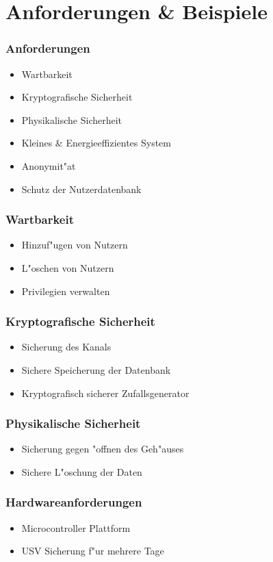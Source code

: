 \section{Anforderungen \& Beispiele}
\begin{frame}
	\frametitle{Anforderungen}
	\begin{itemize}
		\item<2-> Wartbarkeit
		\item<3-> Kryptografische Sicherheit
		\item<4-> Physikalische Sicherheit
		\item<5-> Kleines \& Energieeffizientes System
		\item<6-> Anonymit"at
		\item<7-> Schutz der Nutzerdatenbank
	\end{itemize}
\end{frame}
\begin{frame}
	\frametitle{Wartbarkeit}
	\begin{itemize}
		\item<2-> Hinzuf"ugen von Nutzern
		\item<3-> L"oschen von Nutzern
		\item<4-> Privilegien verwalten
	\end{itemize}
\end{frame}
\begin{frame}
	\frametitle{Kryptografische Sicherheit}
	\begin{itemize}
		\item<2-> Sicherung des Kanals
		\item<3-> Sichere Speicherung der Datenbank
		\item<4-> Kryptografisch sicherer Zufallsgenerator
	\end{itemize}
\end{frame}

\begin{frame}
	\frametitle{Physikalische Sicherheit}
	\begin{itemize}
		\item<2-> Sicherung gegen "offnen des Geh"auses
		\item<3-> Sichere L"oschung der Daten
	\end{itemize}
\end{frame}

\begin{frame}
	\frametitle{Hardwareanforderungen}
	\begin{itemize}
		\item<2-> Microcontroller Plattform
		\item<3-> USV Sicherung f"ur mehrere Tage
	\end{itemize}
\end{frame}
